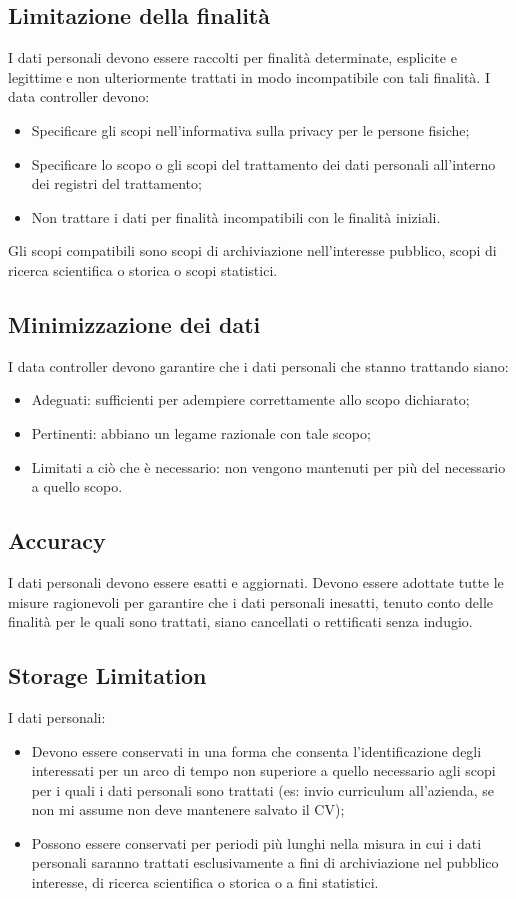 \subsection{Limitazione della finalità}
I dati personali devono essere raccolti per finalità determinate, esplicite e legittime e non ulteriormente trattati in modo incompatibile con tali finalità. I data controller devono:
\begin{itemize}
    \item Specificare gli scopi nell'informativa sulla privacy per le persone fisiche;
    \item Specificare lo scopo o gli scopi del trattamento dei dati personali all'interno dei registri del trattamento;
    \item Non trattare i dati per finalità incompatibili con le finalità iniziali.
\end{itemize}

\noindent Gli scopi compatibili sono scopi di archiviazione nell'interesse pubblico, scopi di ricerca scientifica o storica o scopi statistici.

\subsection{Minimizzazione dei dati}
I data controller devono garantire che i dati personali che stanno trattando siano:
\begin{itemize}
    \item Adeguati: sufficienti per adempiere correttamente allo scopo dichiarato;
    \item Pertinenti: abbiano un legame razionale con tale scopo;
    \item Limitati a ciò che è necessario: non vengono mantenuti per più del necessario a quello scopo.
\end{itemize}

\subsection{Accuracy}
I dati personali devono essere esatti e aggiornati. Devono essere adottate tutte le misure ragionevoli per garantire che i dati personali inesatti, tenuto conto delle finalità per le quali sono trattati, siano cancellati o rettificati senza indugio.

\subsection{Storage Limitation}
I dati personali:
\begin{itemize}
    \item Devono essere conservati in una forma che consenta l'identificazione degli interessati per un arco di tempo non superiore a quello necessario agli scopi per i quali i dati personali sono trattati (es: invio curriculum all'azienda, se non mi assume non deve mantenere salvato il CV);
    \item Possono essere conservati per periodi più lunghi nella misura in cui i dati personali saranno trattati esclusivamente a fini di archiviazione nel pubblico interesse, di ricerca scientifica o storica o a fini statistici.
\end{itemize}

